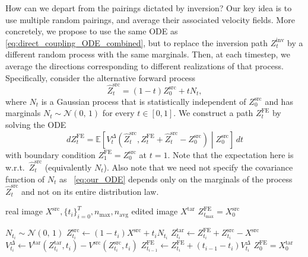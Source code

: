 How can we depart from the pairings dictated by inversion? Our key idea is to use multiple random pairings, and average their associated velocity fields. More concretely, we propose to use the same ODE as \eqref{eq:direct_coupling_ODE_combined}, but to replace the inversion path $Z^{\text{inv}}_t$ by a different random process with the same marginals. Then, at each timestep, we average the directions corresponding to different realizations of that process. 
Specifically, consider the alternative forward process
\begin{equation}
\label{eq:our_marginals}
    \hat{Z}^{\text{src}}_{t} =(1-t)Z_0^{\text{src}}+tN_{t},
\end{equation}
where $N_{t}$ is a Gaussian process that is statistically independent of $Z^{\text{src}}_0$ and has marginals $N_{t}\sim\mathcal{N}(0,\,1)$ for every $t\in[0,1]$. We construct a path $Z^{\text{FE}}_t$ by solving the ODE
\begin{equation}
\label{eq:our_ODE}
    dZ^{\text{FE}}_t= \mathbb{E}\left[V^{\Delta}_{t}(\hat{Z}^{\text{src}}_{t},Z^{\text{FE}}_t+\hat{Z}^{\text{src}}_t-Z^{\text{src}}_0) \middle| Z^{\text{src}}_0\right]\,dt 
\end{equation}
with boundary condition $Z^{\text{FE}}_1=Z^{\text{src}}_0$ at $t=1$. Note that the expectation here is w.r.t.~$\hat{Z}^{\text{src}}_{t}$ (equivalently $N_t$). Also note that we need not specify the covariance function of $N_t$ as ~\eqref{eq:our_ODE} depends only on the marginals of the process $\hat{Z}^{\text{src}}_{t}$ and not on its entire distribution law.

\begin{algorithm}[tb]
   \caption{Simplified algorithm for \ours{}}
   \label{alg:simple}
\begin{algorithmic}
   real image $X^{\text{src}},\big\{t_i\big\}^T_{i=0}, n_{\text{max}}, n_{\text{avg}}$ 
    edited image $X^{\text{tar}}$
    $Z^{\text{FE}}_{t_{\text{max}}}=X^{\text{src}}_0$
   
   \STATE $N_{t_i} \sim \mathcal{N}(0,\,1)$
   \STATE $Z^{\text{src}}_{t_i} \leftarrow (1-t_i)X^{\text{src}} + t_iN_{t_i}$
   \STATE $Z^{\text{tar}}_{t_i} \leftarrow Z^{\text{FE}}_{t_i} +Z^{\text{src}}_{t_i}- X^{\text{src}}$
   \STATE $V^{\Delta}_{t_i} \leftarrow V^{\text{tar}}(Z^{\text{tar}}_{t_i},t_i)-V^{\text{src}}(Z^{\text{src}}_{t_i},t_i)$
   \STATE $Z^{\text{FE}}_{t_{i-1}} \leftarrow Z^{\text{FE}}_{t_i} + (t_{i-1}-t_{i})V^{\Delta}_{t_i}$
   \ENDFOR
    $Z^{\text{FE}}_{0} = X_{0}^{\text{tar}}$
\end{algorithmic}
\end{algorithm}

